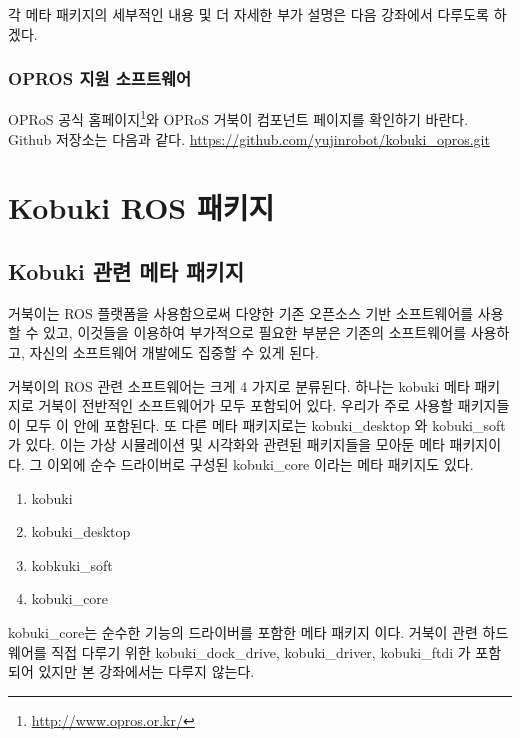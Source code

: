 \vspace{\baselineskip}
\noindent
각 메타 패키지의 세부적인 내용 및 더 자세한 부가 설명은 다음 강좌에서 다루도록 하겠다.

\subsubsection{OPROS 지원 소프트웨어}

OPRoS 공식 홈페이지\footnote{\url{http://www.opros.or.kr/}}와 OPRoS 거북이 컴포넌트 페이지를 확인하기 바란다. Github 저장소는 다음과 같다.
\url{https://github.com/yujinrobot/kobuki_opros.git}

\section{Kobuki ROS 패키지}

\subsection{Kobuki 관련 메타 패키지}

거북이는 ROS 플랫폼을 사용함으로써 다양한 기존 오픈소스 기반 소프트웨어를 사용할 수 있고, 이것들을 이용하여 부가적으로 필요한 부분은 기존의 소프트웨어를 사용하고, 자신의 소프트웨어 개발에도 집중할 수 있게 된다. 

거북이의 ROS 관련 소프트웨어는 크게 4 가지로 분류된다. 하나는 kobuki 메타 패키지로 거북이 전반적인 소프트웨어가 모두 포함되어 있다. 우리가 주로 사용할 패키지들이 모두 이 안에 포함된다. 또 다른 메타 패키지로는 kobuki\_desktop 와 kobuki\_soft 가 있다. 이는 가상 시뮬레이션 및 시각화와 관련된 패키지들을 모아둔 메타 패키지이다. 그 이외에 순수 드라이버로 구성된 kobuki\_core 이라는 메타 패키지도 있다.

\begin{enumerate}
\item kobuki
\item kobuki\_desktop
\item kobkuki\_soft
\item kobuki\_core
\end{enumerate}

kobuki\_core는 순수한 기능의 드라이버를 포함한 메타 패키지 이다. 거북이 관련 하드웨어를 직접 다루기 위한 kobuki\_dock\_drive, kobuki\_driver, kobuki\_ftdi 가 포함되어 있지만 본 강좌에서는 다루지 않는다.

